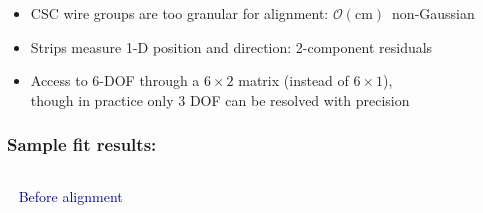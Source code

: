 \documentclass[compress]{beamer}
\begin{document}
\begin{frame}
\vspace{0.3 cm}
\begin{itemize}
\item CSC wire groups are too granular for alignment: \mbox{$\mathcal{O}(\mbox{cm})$ non-Gaussian\hspace{-1 cm}}
\item Strips measure 1-D position and direction: 2-component residuals
\item Access to 6-DOF through a $6\times 2$ matrix (instead of $6\times 1$), \\ though in practice only 3 DOF can be resolved with precision
\end{itemize}
\end{frame}

\begin{frame}
\frametitle{Sample fit results: }

\vspace{0.25 cm}
\begin{columns}

\mbox{ } \hfill \textcolor{darkblue}{Before alignment} \hfill \mbox{ }


\end{columns}
\end{frame}
\end{document}
